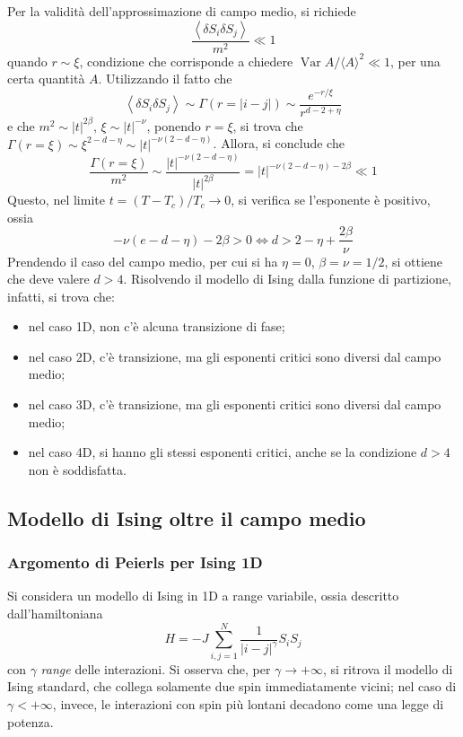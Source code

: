 \documentclass[11pt, a4paper]{scrartcl}
\theoremstyle{style}
\theoremstyle{style1}
\numberwithin{equation}{subsection}
\begin{document}
Per la validit\`a dell'approssimazione di campo medio, si richiede
\[
\frac{\left\langle \delta S_i \delta S_j \right\rangle}{m^2} \ll 1
\] 
quando $r \sim \xi $, condizione che corrisponde a chiedere $\operatorname{Var} A / \langle A \rangle^2 \ll 1$, per una certa quantit\`a $A$.
Utilizzando il fatto che 
\[
\left\langle \delta S_i \delta S_j \right\rangle \sim \Gamma (r = \lvert i-j \rvert ) \sim \frac{e^{-r / \xi }}{r^{d-2+\eta}}
\] 
e che $m^2 \sim\lvert t \rvert ^{2\beta } $, $\xi \sim \lvert t \rvert ^{-\nu }$, ponendo $r = \xi $, si trova che $\Gamma(r=\xi ) \sim\xi ^{2 - d - \eta} \sim\lvert t \rvert ^{-\nu (2-d-\eta)}$.
Allora, si conclude che
\[
\frac{\Gamma(r=\xi )}{m^2}\sim \frac{\lvert t \rvert ^{-\nu (2-d-\eta)}}{\lvert t \rvert ^{2\beta } } = \lvert t \rvert ^{-\nu (2-d-\eta)-2\beta }\ll 1
\] 
Questo, nel limite $t = (T-T_c)/T_c \to 0$, si verifica se l'esponente \`e positivo, ossia
\[
- \nu (e-d-\eta) - 2\beta > 0 \iff d > 2 - \eta + \frac{2\beta }{\nu }
\] 
Prendendo il caso del campo medio, per cui si ha $\eta = 0$, $\beta  = \nu  =  1/2$, si ottiene che deve valere $d > 4$.
Risolvendo il modello di Ising dalla funzione di partizione, infatti, si trova che:
\begin{itemize}
	\item nel caso 1D, non c'\`e alcuna transizione di fase;
	\item nel caso 2D, c'\`e transizione, ma gli esponenti critici sono diversi dal campo medio;
	\item nel caso 3D, c'\`e transizione, ma gli esponenti critici sono diversi dal campo medio;
	\item nel caso 4D, si hanno gli stessi esponenti critici, anche se la condizione $d>4$ non \`e soddisfatta.
\end{itemize}

\subsection{Modello di Ising oltre il campo medio}
\subsubsection{Argomento di Peierls per Ising 1D}

Si considera un modello di Ising in 1D a range variabile, ossia descritto dall'hamiltoniana
\[
H = - J \sum_{i,j=1}^{N} \frac{1}{\lvert i - j \rvert ^{\gamma}}S_iS_j
\] 
con $\gamma$ \textit{range} delle interazioni.
Si osserva che, per $\gamma\to +\infty$, si ritrova il modello di Ising standard, che collega solamente due spin immediatamente vicini; nel caso di $\gamma < +\infty$, invece, le interazioni con spin pi\`u lontani decadono come una legge di potenza.
\end{document}
